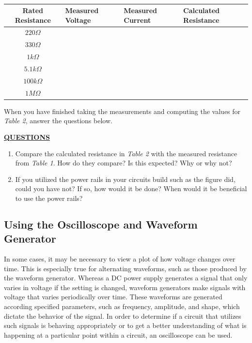 \documentclass[12pt]{article}
\begin{document}
\begin{table}[H]
    \centering
    \begin{tabular}{|c||l|l|l|}
        \hline
        Rated Resistance & Measured Voltage & Measured Current & Calculated Resistance  \\ \hline \hline
        $220\Omega$      &                  &                  &                        \\ \hline
        $330\Omega$      &                  &                  &                        \\ \hline
        $1k\Omega$       &                  &                  &                        \\ \hline
        $5.1k\Omega$     &                  &                  &                        \\ \hline
        $100k\Omega$     &                  &                  &                        \\ \hline
        $1M\Omega$       &                  &                  &                        \\ \hline
    \end{tabular}
    \caption{}
\end{table}

When you have finished taking the measurements and computing the values for \textit{Table 2}, answer the questions below.

\textbf{\underline{QUESTIONS}}
\begin{enumerate}
    \item Compare the calculated resistance in \textit{Table 2} with the measured resistance from \textit{Table 1}. How do they compare? Is this expected? Why or why not?
        \fillwithlines{1in}
    
    \item If you utilized the power rails in your circuits build such as the figure did, could you have not? If so, how would it be done? When would it be beneficial to use the power rails?
        \fillwithlines{1in}
\end{enumerate}

\checkoffsubsub

\subsection{Using the Oscilloscope and Waveform Generator}

In some cases, it may be necessary to view a plot of how voltage changes over time. This is especially true for alternating waveforms, such as those produced by the waveform generator. Whereas a DC power supply generates a signal that only varies in voltage if the setting is changed, waveform generators make signals with voltage that varies periodically over time. These waveforms are generated according specified parameters, such as frequency, amplitude, and shape, which dictate the behavior of the signal. In order to determine if a circuit that utilizes such signals is behaving appropriately or to get a better understanding of what is happening at a particular point within a circuit, an oscilloscope can be used.
\end{document}
